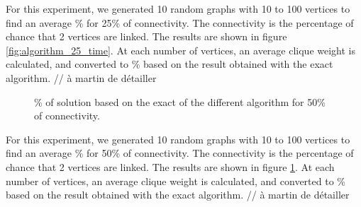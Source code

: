 For this experiment, we generated 10 random graphs with 10 to 100 vertices to find an
average \% for 25\% of connectivity. The connectivity is the percentage
of chance that 2 vertices are linked. The results are shown in figure \ref{fig:algorithm_25_time}. At each number of
vertices, an average clique weight is calculated, and converted to \% based on the result obtained with the exact algorithm.
// à martin de détailler

\begin{figure}[H]
    \centering
    \caption{\% of solution based on the exact of the different algorithm for 50\% of connectivity.}
    \label{fig:algorithm_50_time}
\end{figure}

For this experiment, we generated 10 random graphs with 10 to 100 vertices to find an
average \% for 50\% of connectivity. The connectivity is the percentage
of chance that 2 vertices are linked. The results are shown in figure \ref{fig:algorithm_50_time}. At each number of
vertices, an average clique weight is calculated, and converted to \% based on the result obtained with the exact algorithm.
// à martin de détailler

